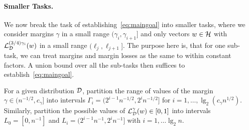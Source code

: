 \paragraph{Smaller Tasks.}
We now break the task of establishing~\eqref{eq:maingoal} into smaller tasks, where we consider margins $\gamma$ in a small range $(\gamma_i, \gamma_{i+1}]$ and only vectors $w \in \mathcal{H}$ with $\mathcal{L}^{(3/4)\gamma_i}_{\mathcal{D}}(w)$ in a small range $(\ell_j,\ell_{j+1}]$. The purpose here is, that for one sub-task, we can treat margins and margin losses as the same to within constant factors. A union bound over all the sub-tasks then suffices to establish~\eqref{eq:maingoal}.

For a given distribution $\mathcal{D}$, partition the range of values of the margin $\gamma \in (n^{-1/2},c_\gamma]$ into intervals $\Gamma_i = (2^{i-1} n^{-1/2}, 2^{i} n^{-1/2}]$ for $i=1,\dots,\lg_2(c_\gamma n^{1/2})$. Similarly, partition the possible values of $\mathcal{L}^\gamma_{\mathcal{D}}(w) \in [0,1]$ into intervals $L_0 = [0, n^{-1}]$ and $L_i = (2^{i-1} n^{-1}, 2^{i} n^{-1}]$ with $i=1,\dots \lg_2 n$.

